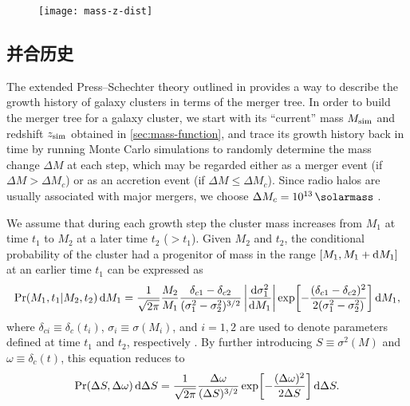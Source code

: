\begin{figure}[htp]
  \centering
  \texttt{[image: mass-z-dist]}
  \label{fig:m-z-dist}
\end{figure}

\subsection{并合历史}
\label{sec:merging-history}

The extended Press--Schechter theory outlined in  provides
a way to describe the growth history of galaxy clusters in terms of the
merger tree.
In order to build the merger tree for a galaxy cluster, we start with
its \enquote{current} mass $M_{\mathrm{sim}}$ and redshift $z_{\mathrm{sim}}$ obtained
in \autoref{sec:mass-function}, and trace its growth history back in time
by running Monte Carlo simulations to randomly determine the mass change
$\Delta M$ at each step, which may be regarded either as a merger event
(if $\Delta M > \Delta M_c$) or as an accretion event
(if $\Delta M \leq \Delta M_c$).
Since radio halos are usually associated with major mergers, we choose
$\Delta M_c = \SI{e13}{\solarmass}$ \cite{cassano2005}.

We assume that during each growth step the cluster mass increases
from $M_1$ at time $t_1$ to $M_2$ at a later time $t_2$ ($> t_1$).
Given $M_2$ and $t_2$, the conditional probability of the cluster had
a progenitor of mass in the range $[M_1, M_1 + \mathrm{d}M_1]$ at an earlier
time $t_1$ can be expressed as
\begin{equation}
  \label{eq:eps-condprob}
  \mathrm{Pr}(M_1, t_1 | M_2, t_2) \,\mathrm{d}M_1 =
    \frac{1}{\sqrt{2\pi}} \frac{M_2}{M_1}
    \frac{\delta_{c1} - \delta_{c2}}{(\sigma_1^2 - \sigma_2^2)^{3/2}}
    \left| \frac{\mathrm{d}\sigma_1^2}{\mathrm{d}M_1} \right|
    \exp \!\left[ -\frac{(\delta_{c1} - \delta_{c2})^2}
      {2(\sigma_1^2 - \sigma_2^2)} \right] \mathrm{d}M_1 ,
\end{equation}
where
$\delta_{ci} \equiv \delta_c(t_i)$, $\sigma_i \equiv \sigma(M_i)$, and
$i = 1, 2$ are used to denote parameters defined at time $t_1$ and $t_2$,
respectively \cite{lacey1993,randall2002}.
By further introducing $S \equiv \sigma^2(M)$ and
$\omega \equiv \delta_c(t)$, this equation reduces to
\begin{equation}
  \label{eq:eps-condprob-simp}
  \mathrm{Pr}(\Delta S, \Delta \omega) \,\mathrm{d}\Delta S = \frac{1}{\sqrt{2\pi}}
  \frac{\Delta\omega}{(\Delta S)^{3/2}}
  \exp \!\left[ -\frac{(\Delta\omega)^2}{2 \Delta S} \right] \mathrm{d}\Delta S.
\end{equation}

